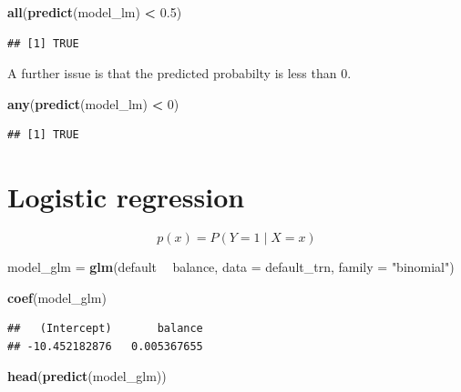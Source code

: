\documentclass[]{report}
\newenvironment{Shaded}{\begin{snugshade}}{\end{snugshade}}
\newcommand{\KeywordTok}[1]{\textcolor[rgb]{0.13,0.29,0.53}{\textbf{#1}}}
\newcommand{\DataTypeTok}[1]{\textcolor[rgb]{0.13,0.29,0.53}{#1}}
\newcommand{\DecValTok}[1]{\textcolor[rgb]{0.00,0.00,0.81}{#1}}
\newcommand{\FloatTok}[1]{\textcolor[rgb]{0.00,0.00,0.81}{#1}}
\newcommand{\StringTok}[1]{\textcolor[rgb]{0.31,0.60,0.02}{#1}}
\newcommand{\OperatorTok}[1]{\textcolor[rgb]{0.81,0.36,0.00}{\textbf{#1}}}
\newcommand{\NormalTok}[1]{#1}
\begin{document}
\begin{Shaded}
\begin{Highlighting}[]
\KeywordTok{all}\NormalTok{(}\KeywordTok{predict}\NormalTok{(model_lm) }\OperatorTok{<}\StringTok{ }\FloatTok{0.5}\NormalTok{)}
\end{Highlighting}
\end{Shaded}

\begin{verbatim}
## [1] TRUE
\end{verbatim}

A further issue is that the predicted probabilty is less than 0.

\begin{Shaded}
\begin{Highlighting}[]
\KeywordTok{any}\NormalTok{(}\KeywordTok{predict}\NormalTok{(model_lm) }\OperatorTok{<}\StringTok{ }\DecValTok{0}\NormalTok{)}
\end{Highlighting}
\end{Shaded}

\begin{verbatim}
## [1] TRUE
\end{verbatim}

\chapter{Logistic regression}\label{logistic-regression}

\[p(x) = P(Y = 1 \mid {X = x})\]

\begin{Shaded}
\begin{Highlighting}[]
\NormalTok{model_glm =}\StringTok{ }\KeywordTok{glm}\NormalTok{(default }\OperatorTok{~}\StringTok{ }\NormalTok{balance, }\DataTypeTok{data =}\NormalTok{ default_trn, }\DataTypeTok{family =} \StringTok{"binomial"}\NormalTok{)}
\end{Highlighting}
\end{Shaded}

\begin{Shaded}
\begin{Highlighting}[]
\KeywordTok{coef}\NormalTok{(model_glm)}
\end{Highlighting}
\end{Shaded}

\begin{verbatim}
##   (Intercept)       balance 
## -10.452182876   0.005367655
\end{verbatim}

\begin{Shaded}
\begin{Highlighting}[]
\KeywordTok{head}\NormalTok{(}\KeywordTok{predict}\NormalTok{(model_glm))}
\end{Highlighting}
\end{Shaded}
\end{document}
